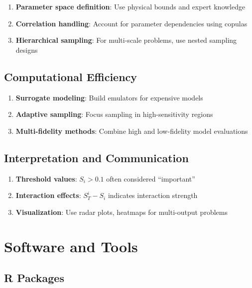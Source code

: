 \documentclass[
  letterpaper,
  DIV=11,
  numbers=noendperiod]{scrreprt}
\providecommand{\tightlist}{%
  \setlength{\itemsep}{0pt}\setlength{\parskip}{0pt}}
\begin{document}
\begin{enumerate}
\def\labelenumi{\arabic{enumi}.}
\tightlist
\item
  \textbf{Parameter space definition}: Use physical bounds and expert
  knowledge
\item
  \textbf{Correlation handling}: Account for parameter dependencies
  using copulas
\item
  \textbf{Hierarchical sampling}: For multi-scale problems, use nested
  sampling designs
\end{enumerate}

\subsection{Computational Efficiency}\label{computational-efficiency}

\begin{enumerate}
\def\labelenumi{\arabic{enumi}.}
\tightlist
\item
  \textbf{Surrogate modeling}: Build emulators for expensive models
\item
  \textbf{Adaptive sampling}: Focus sampling in high-sensitivity regions
\item
  \textbf{Multi-fidelity methods}: Combine high and low-fidelity model
  evaluations
\end{enumerate}

\subsection{Interpretation and
Communication}\label{interpretation-and-communication}

\begin{enumerate}
\def\labelenumi{\arabic{enumi}.}
\tightlist
\item
  \textbf{Threshold values}: \(S_i > 0.1\) often considered
  ``important''
\item
  \textbf{Interaction effects}: \(S_T^i - S_i\) indicates interaction
  strength
\item
  \textbf{Visualization}: Use radar plots, heatmaps for multi-output
  problems
\end{enumerate}

\section{Software and Tools}\label{software-and-tools}

\subsection{R Packages}\label{r-packages}
\end{document}
